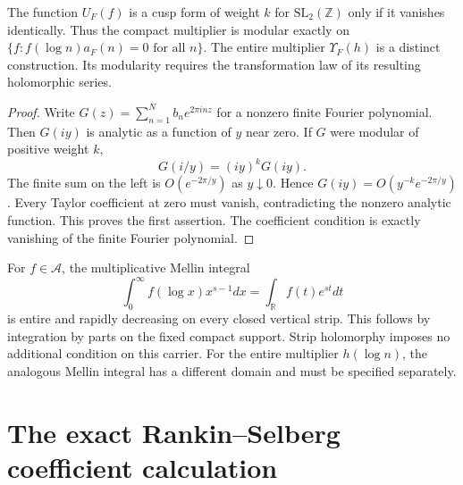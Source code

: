 \begin{theorem}
\label{v4-arith:w5-a:lem:upsilon-cuspidal}
The function $U_F(f)$ is a cusp form of weight $k$ for
$\mathrm{SL}_2(\mathbb Z)$ only if it vanishes identically.
Thus the compact multiplier is modular exactly on
$\{f:f(\log n)a_F(n)=0\text{ for all }n\}$.
The entire multiplier $\Upsilon_F(h)$ is a distinct construction.
Its modularity requires the transformation law of its resulting
holomorphic series.
\end{theorem}
\begin{proof}
Write $G(z)=\sum_{n=1}^N b_n e^{2\pi inz}$ for a nonzero finite
Fourier polynomial. Then $G(iy)$ is analytic as a function of $y$
near zero. If $G$ were modular of positive weight $k$,
\[
 G(i/y)=(iy)^kG(iy).
\]
The finite sum on the left is $O(e^{-2\pi/y})$ as $y\downarrow0$.
Hence $G(iy)=O(y^{-k}e^{-2\pi/y})$. Every Taylor coefficient at
zero must vanish, contradicting the nonzero analytic function.
This proves the first assertion. The coefficient condition is
exactly vanishing of the finite Fourier polynomial.
\end{proof}

\begin{remark}
\label{v4-arith:w5-a:rem:H2-obstruction}
\label{v4-arith:w5-a:rem:domain-PW-hol}
For $f\in\mathscr A$, the multiplicative Mellin integral
\[
 \int_0^\infty f(\log x)x^{s-1}dx=\int_{\mathbb R}f(t)e^{st}dt
\]
is entire and rapidly decreasing on every closed vertical strip.
This follows by integration by parts on the fixed compact support.
Strip holomorphy imposes no additional condition on this carrier.
For the entire multiplier $h(\log n)$, the analogous Mellin integral
has a different domain and must be specified separately.
\end{remark}

\section{The exact Rankin--Selberg coefficient calculation}
\label{v4-arith:w5-a:petersson}
\label{v4-arith:w5-a:mellin-lift:RS}

